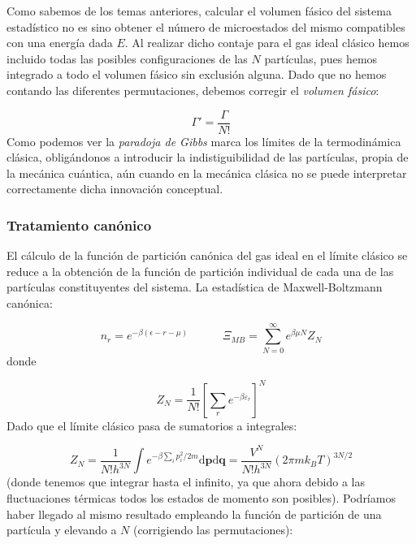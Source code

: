 \documentclass[12pt,a4paper]{article}
\numberwithin{equation}{section}
\numberwithin{figure}{section}
\newcommand{\tquad}{\quad \quad \quad}
\newcommand{\ccorchetes}[1]{\left[ #1  \right]}
\newcommand{\D}{\mathrm{d}}
\newcommand{\pn}{\mathbf{p}}
\newcommand{\qn}{\mathbf{q}}
\theoremstyle{definition}
\begin{document}
Como sabemos de los temas anteriores, calcular el volumen fásico del sistema estadístico no es sino obtener el número de microestados del mismo compatibles con una energía dada $E$. Al realizar dicho contaje para el gas ideal clásico hemos incluido todas las posibles configuraciones de las $N$ partículas, pues hemos integrado a todo el volumen fásico sin exclusión alguna. Dado que no hemos contando las diferentes permutaciones, debemos corregir el \textit{volumen fásico}:

\begin{equation}
\Gamma ' = \frac{\Gamma}{N!}
\end{equation}
Como podemos ver la \textit{paradoja de Gibbs} marca los límites de la termodinámica clásica, obligándonos a introducir la indistiguibilidad de las partículas, propia de la mecánica cuántica, aún cuando en la mecánica clásica no se puede interpretar correctamente dicha innovación conceptual. 

\subsubsection{Tratamiento canónico}

El cálculo de la función de partición canónica del gas ideal en el límite clásico se reduce a la obtención de la función de partición individual de cada una de las partículas constituyentes del sistema. La estadística de Maxwell-Boltzmann canónica:

\begin{equation}
n_r = e^{-\beta (\epsilon-r - \mu) } \tquad \Xi_{MB} = \sum_{N=0}^\infty e^{\beta \mu N} Z_N
\end{equation}
donde 

\begin{equation}
Z_N = \frac{1}{N!} \ccorchetes{\sum_r e^{-\beta \varepsilon_r} }^N
\end{equation}
Dado que el límite clásico pasa de sumatorios a integrales:

\begin{equation}
Z_N = \frac{1}{N! h^{3N}} \int e^{-\beta \sum_i p_i^2 / 2m} \D \pn \D \qn = \frac{V^N}{N! h^{3N}} (2\pi m k_B T)^{3N/2} 
\end{equation}
(donde tenemos que integrar hasta el infinito, ya que ahora debido a las fluctuaciones térmicas todos los estados de momento son posibles). Podríamos haber llegado al mismo resultado empleando la función de partición de una partícula y elevando a $N$ (corrigiendo las permutaciones):
\end{document}
